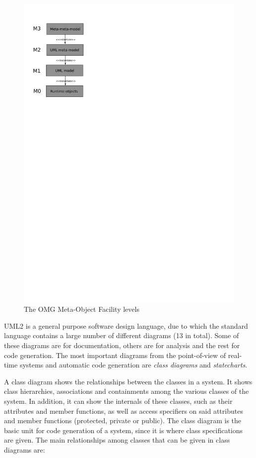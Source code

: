 \begin{figure}
\centering
\includegraphics[scale=0.75]{figs/mof}
\caption{The OMG Meta-Object Facility levels}
\label{fig:mof}
\end{figure}

UML2 is a general purpose software design language, due to which the
standard language contains a large number of different diagrams (13 in
total). Some of these diagrams are for documentation, others are for
analysis and the rest for code generation. The most important diagrams
from the point-of-view of real-time systems and automatic code
generation are \emph{class diagrams} and \emph{statecharts}.

A class diagram shows the relationships between the classes in a
system. It shows class hierarchies, associations and containments
among the various classes of the system. In addition, it can show the
internals of these classes, such as their attributes and member
functions, as well as access specifiers on said attributes and member
functions (protected, private or public). The class diagram is the
basic unit for code generation of a system, since it is where class
specifications are given. The main relationships among classes that
can be given in class diagrams are:

